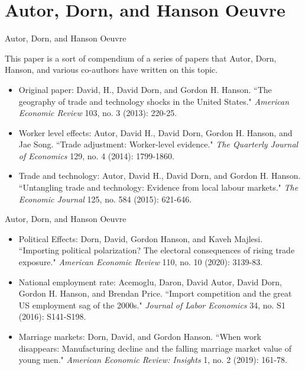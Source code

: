 \documentclass[aspectratio=169]{beamer}
\begin{document}
\section{Autor, Dorn, and Hanson Oeuvre}


\begin{frame}{Autor, Dorn, and Hanson Oeuvre}

This paper is a sort of compendium of a series of papers that Autor, Dorn, Hanson, and various co-authors have written on this topic.
\begin{itemize}
    \item<1-> Original paper:  David, H., David Dorn, and Gordon H. Hanson. ``The geography of trade and technology shocks in the United States." \emph{American Economic Review} 103, no. 3 (2013): 220-25.
    \item<2-> Worker level effects:  Autor, David H., David Dorn, Gordon H. Hanson, and Jae Song. ``Trade adjustment: Worker-level evidence." \emph{The Quarterly Journal of Economics} 129, no. 4 (2014): 1799-1860.
    \item<3-> Trade and technology:  Autor, David H., David Dorn, and Gordon H. Hanson. ``Untangling trade and technology: Evidence from local labour markets." \emph{The Economic Journal} 125, no. 584 (2015): 621-646.  
\end{itemize}
    
\end{frame}


\begin{frame}{Autor, Dorn, and Hanson Oeuvre}

\begin{itemize}
    \item<1-> Political Effects: Dorn, David, Gordon Hanson, and Kaveh Majlesi. ``Importing political polarization? The electoral consequences of rising trade exposure." \emph{American Economic Review} 110, no. 10 (2020): 3139-83.
    \item<2-> National employment rate:  Acemoglu, Daron, David Autor, David Dorn, Gordon H. Hanson, and Brendan Price. ``Import competition and the great US employment sag of the 2000s." \emph{Journal of Labor Economics} 34, no. S1 (2016): S141-S198.
    \item<3-> Marriage markets: Dorn, David, and Gordon Hanson. ``When work disappears: Manufacturing decline and the falling marriage market value of young men." \emph{American Economic Review: Insights} 1, no. 2 (2019): 161-78.  
\end{itemize}
    
\end{frame}

\end{document}
